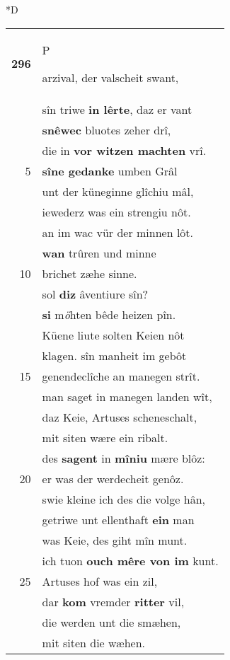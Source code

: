 \documentclass[8pt,a4paper,notitlepage]{article}
\begin{document}
\begin{table}[ht]
\begin{minipage}[t]{0.5\linewidth}
\small
\begin{center}*D
\end{center}
\begin{tabular}{rl}
\textbf{296} & \begin{large}P\end{large}arzival, der valscheit swant,\\ 
 & sîn triwe \textbf{in lêrte}, daz er vant\\ 
 & \textbf{snêwec} bluotes zeher drî,\\ 
 & die in \textbf{vor witzen machten} vrî.\\ 
5 & \textbf{sîne gedanke} umben Grâl\\ 
 & unt der küneginne glîchiu mâl,\\ 
 & iewederz was ein strengiu nôt.\\ 
 & an im wac vür der minnen lôt.\\ 
 & \textbf{wan} trûren und minne\\ 
10 & brichet zæhe sinne.\\ 
 & sol \textbf{diz} âventiure sîn?\\ 
 & \textbf{si} m\textit{ö}hten bêde heizen pîn.\\ 
 & Küene liute solten Keien nôt\\ 
 & klagen. sîn manheit im gebôt\\ 
15 & genendeclîche an manegen strît.\\ 
 & man saget in manegen landen wît,\\ 
 & daz Keie, Artuses scheneschalt,\\ 
 & mit siten wære ein ribalt.\\ 
 & des \textbf{sagent} in \textbf{mîniu} mære blôz:\\ 
20 & er was der werdecheit genôz.\\ 
 & swie kleine ich des die volge hân,\\ 
 & getriwe unt ellenthaft \textbf{ein} man\\ 
 & was Keie, des giht mîn munt.\\ 
 & ich tuon \textbf{ouch mêre von im} kunt.\\ 
25 & Artuses hof was ein zil,\\ 
 & dar \textbf{kom} vremder \textbf{ritter} vil,\\ 
 & die werden unt die smæhen,\\ 
 & mit siten die wæhen.\\ 

\end{tabular}
\end{minipage}
\end{table}
\end{document}
